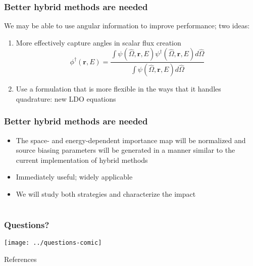 \documentclass[xcolor=x11names,compress]{beamer}
\renewcommand{\(}{\begin{columns}}
\renewcommand{\)}{\end{columns}}
\newcommand{\<}[1]{\begin{column}{#1}}
\renewcommand{\>}{\end{column}}
\newcommand{\vOmega}{\ensuremath{\hat{\Omega}}}
\newcommand{\ve}[1]{\ensuremath{\mathbf{#1}}}
\begin{document}
\begin{frame}[fragile]
  \frametitle{Better hybrid methods are needed}

We may be able to use angular information to improve performance; two ideas: \vspace*{1 em}

	\begin{enumerate}
	\item More effectively capture angles in scalar flux creation
		\begin{equation}
		\phi^{\dagger}(\ve{r},E) = \frac{\int \psi(\vOmega, \ve{r},E) \psi^{\dagger}(\vOmega, \ve{r},E) d\vOmega}{\int \psi(\vOmega, \ve{r},E)  d\vOmega}
		\end{equation}

	\item Use a formulation that is more flexible in the ways that 
	it handles quadrature: new LDO equations \cite{Ahrens2014}
	\end{enumerate}

\end{frame}



\begin{frame}[fragile]
  \frametitle{Better hybrid methods are needed}

  	\begin{itemize}
    \item The space- and energy-dependent importance map will be normalized and 
    source biasing parameters will be generated in a manner similar to the current
     implementation of hybrid methods \vspace*{1 em}
	\item Immediately useful; widely applicable \vspace*{1 em}
	\item We will study both strategies and characterize the impact
	\end{itemize}
	
\end{frame}


\section*{}
\begin{frame}[fragile]
  \frametitle{Questions?}
  \begin{center}
  \texttt{[image: ../questions-comic]}  
  \end{center}
  
\end{frame}

\begin{frame}[allowframebreaks]{References}
	
	
\end{frame}
\end{document}
